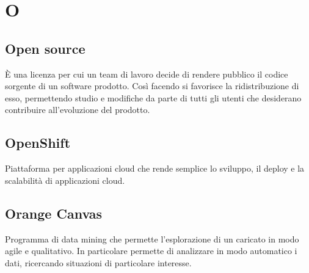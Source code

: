 \section*{O}
\markright{}

\subsection*{Open source}
È una licenza per cui un team di lavoro decide di rendere pubblico il codice sorgente di un software prodotto. Così facendo si favorisce la ridistribuzione di esso, permettendo studio e modifiche da parte di tutti gli utenti che desiderano contribuire all'evoluzione del prodotto.

\subsection*{OpenShift}
Piattaforma per applicazioni cloud che rende semplice lo sviluppo, il deploy e la scalabilità di applicazioni cloud.

\subsection*{Orange Canvas}
Programma di data mining  che permette l'esplorazione di un  caricato in modo agile e qualitativo. In particolare permette di analizzare in modo automatico i dati, ricercando situazioni di particolare interesse.